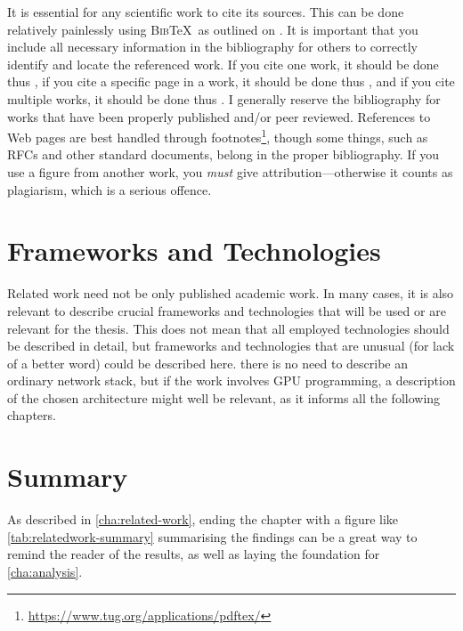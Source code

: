 It is essential for any scientific work to cite its sources. This can be done
relatively painlessly using \textsc{Bib}\negthinspace\TeX\ as outlined on
. It is important that you include all necessary
information in the bibliography for others to correctly identify and locate
the referenced work. If you cite one work, it should be done thus
\cite{Kristensen2010:MP2P2010}, if you cite a specific page in a work, it
should be done thus \cite[p. 410]{Chawathe2003:2003}, and if you cite multiple
works, it should be done thus
\cite{knuth:1976,knuth:1974,Kristensen2010:MP2P2010,Mittelbach2004:TLC2004}.  I generally 
reserve the bibliography for works that have been properly published and/or
peer reviewed. References to Web pages are best handled through
footnotes\footnote{\url{https://www.tug.org/applications/pdftex/}}, though
some things, such as RFCs and other standard documents, belong in the proper
bibliography. If you use a figure from another work, you \emph{must} give
attribution---otherwise it counts as plagiarism, which is a serious offence. 


\section{Frameworks and Technologies}
\label{sec:fram-techn}

Related work need not be only published academic work. In many cases,
it is also relevant to describe crucial frameworks and technologies
that will be used or are relevant for the thesis.  This does not mean
that all employed technologies should be described in detail, but
frameworks and technologies that are unusual (for lack of a better
word) could be described here. \Eg there is no need to describe an
ordinary network stack, but if the work involves GPU programming, a
description of the chosen architecture might well be relevant, as it
informs all the following chapters.

\section{Summary}
\label{sec:summary}
As described in \autoref{cha:related-work}, ending the chapter with a figure
like \autoref{tab:relatedwork-summary} summarising the findings can be a great
way to remind the reader of the results, as well as laying the foundation for
\autoref{cha:analysis}.



